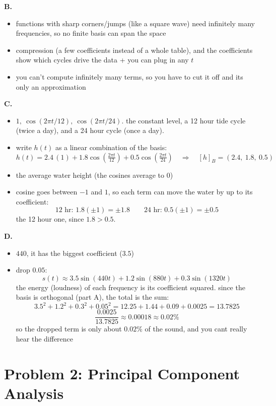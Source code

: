 \documentclass{article}
\begin{document}
\textbf{B.}
\begin{itemize}
  \item[i.] functions with sharp corners/jumps (like a square wave) need infinitely many frequencies, so no finite basis can span the space
  \item[ii.] compression (a few coefficients instead of a whole table), and the coefficients show which cycles drive the data + you can plug in any $t$
  \item[iii.] you can't compute infinitely many terms, so you have to cut it off and its only an approximation
\end{itemize}

\textbf{C.}
\begin{itemize}
  \item[i.] $1,\ \cos(2\pi t/12),\ \cos(2\pi t/24)$. the constant level, a 12 hour tide cycle (twice a day), and a 24 hour cycle (once a day).
  \item[ii.] write $h(t)$ as a linear combination of the basis:
  \[
  h(t) = 2.4\,(1) + 1.8\cos\!\left(\tfrac{2\pi t}{12}\right) + 0.5\cos\!\left(\tfrac{2\pi t}{24}\right)
  \quad\Rightarrow\quad
  \boxed{[h]_B = (2.4,\ 1.8,\ 0.5)}
  \]
  \item[iii.] the average water height (the cosines average to 0)
  \item[iv.] cosine goes between $-1$ and $1$, so each term can move the water by up to its coefficient:
  \[
  \text{12 hr: } 1.8(\pm1) = \pm 1.8 \qquad \text{24 hr: } 0.5(\pm1) = \pm 0.5
  \]
  the 12 hour one, since $1.8 > 0.5$.
\end{itemize}

\textbf{D.}
\begin{itemize}
  \item[i.] $440$, it has the biggest coefficient ($3.5$)
  \item[ii.] drop $0.05$:
  \[
  \boxed{s(t) \approx 3.5\sin(440t) + 1.2\sin(880t) + 0.3\sin(1320t)}
  \]
  the energy (loudness) of each frequency is its coefficient squared. since the basis is orthogonal (part A), the total is the sum:
  \[
  3.5^2 + 1.2^2 + 0.3^2 + 0.05^2 = 12.25 + 1.44 + 0.09 + 0.0025 = 13.7825
  \]
  \[
  \frac{0.0025}{13.7825} \approx 0.00018 \approx 0.02\%
  \]
  so the dropped term is only about $0.02\%$ of the sound, and you cant really hear the difference
\end{itemize}

\section*{Problem 2: Principal Component Analysis}
\end{document}
